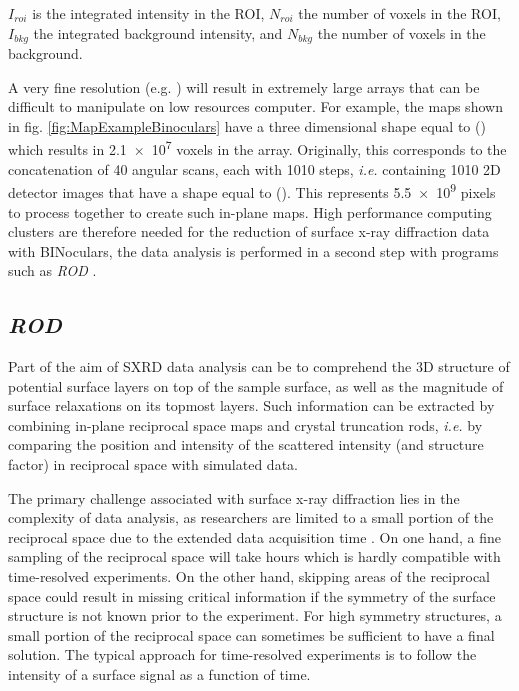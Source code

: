 $I_{roi}$ is the integrated intensity in the ROI, $N_{roi}$ the number of voxels in the ROI, $I_{bkg}$ the integrated background intensity, and $N_{bkg}$ the number of voxels in the background.

A very fine resolution (e.g. ) will result in extremely large arrays that can be difficult to manipulate on low resources computer.
For example, the maps shown in fig. \ref{fig:MapExampleBinoculars} have a three dimensional shape equal to () which results in \num{2.1e7} voxels in the array.
Originally, this corresponds to the concatenation of 40 angular scans, each with 1010 steps, \textit{i.e.} containing 1010 2D detector images that have a shape equal to ().
This represents \num{5.5e9} pixels to process together to create such in-plane maps.
High performance computing clusters are therefore needed for the reduction of surface x-ray diffraction data with BINoculars, the data analysis is performed in a second step with programs such as \textit{ROD} \parencite{Vlieg2000}.

\subsection{\textit{ROD}} \label{sec:ROD}

Part of the aim of SXRD data analysis can be to comprehend the 3D structure of potential surface layers on top of the sample surface, as well as the magnitude of surface relaxations on its topmost layers.
Such information can be extracted by combining in-plane reciprocal space maps and crystal truncation rods, \textit{i.e.} by comparing the position and intensity of the scattered intensity (and structure factor) in reciprocal space with simulated data.

The primary challenge associated with surface x-ray diffraction lies in the complexity of data analysis, as researchers are limited to a small portion of the reciprocal space due to the extended data acquisition time \parencite{Gustafson2014}.
On one hand, a fine sampling of the reciprocal space will take hours which is hardly compatible with time-resolved experiments.
On the other hand, skipping areas of the reciprocal space could result in missing critical information if the symmetry of the surface structure is not known prior to the experiment.
For high symmetry structures, a small portion of the reciprocal space can sometimes be sufficient to have a final solution.
The typical approach for time-resolved experiments is to follow the intensity of a surface signal as a function of time.

